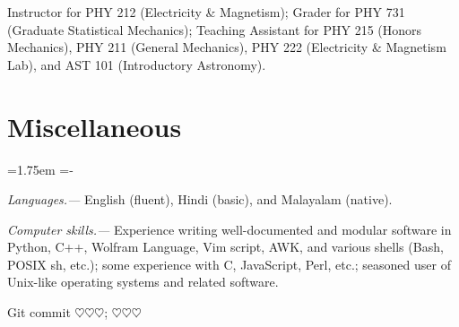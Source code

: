 \documentclass[10pt,article,oneside]{memoir}
\def\hangpars{%
  \leftskip=1.75em%
  \parindent=-\leftskip%
  \setsecindent{-\leftskip}%
  \setsubsecindent{-\leftskip}%
}
\def\gitError{$\heartsuit\heartsuit\heartsuit$}
\def\gitHash{\gitError}
\def\gitShortHash{\gitError}
\def\gitCommitterDate{\gitError}
\begin{document}
Instructor for PHY 212 (Electricity \& Magnetism); Grader for PHY 731 (Graduate Statistical Mechanics); Teaching Assistant for PHY 215 (Honors Mechanics), PHY 211 (General Mechanics), PHY 222 (Electricity \& Magnetism Lab), and AST 101 (Introductory Astronomy).


\section{Miscellaneous}

\hangpars

\emph{Languages.---} English (fluent), Hindi (basic), and Malayalam (native).

\emph{Computer skills.---} Experience writing well-documented and modular software in Python, C++, Wolfram Language, Vim script, AWK, and various shells (Bash, POSIX sh, etc.); some experience with C, JavaScript, Perl, etc.; seasoned user of Unix-like operating systems and related software.


\bigskip

\begin{center}
  \color{gray}
  Git commit \href{https://github.com/manu-mannattil/vitae/tree/\gitHash}{\texttt{\gitShortHash}}; \gitCommitterDate
\end{center}
\end{document}
